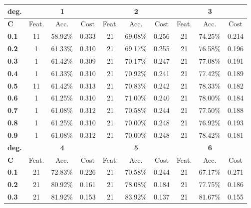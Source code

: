 \begin{table}[h]
    \centering
    \begin{tabular}{l | c c c|c c c|c c c}
        \toprule
        \multicolumn{1}{c}{\textbf{deg.}} & \multicolumn{3}{c}{\textbf{1}} & \multicolumn{3}{c}{\textbf{2}} & \multicolumn{3}{c}{\textbf{3}}\\
        \midrule
        \textbf{C}&Feat.&Acc.&Cost&Feat.&Acc.&Cost&Feat.&Acc.&Cost \\
        \midrule
        \textbf{0.1}&      11 & 58.92\% & 0.333 &      21 & 69.08\% & 0.256 &    21 & 74.25\% & 0.214\\
        \textbf{0.2}&      1  & 61.33\% & 0.310 &      21 & 69.17\% & 0.255 &    21 & 76.58\% & 0.196\\
        \textbf{0.3}&      1  & 61.42\% & 0.309 &      21 & 70.17\% & 0.247 &    21 & 77.08\% & 0.191\\
        \textbf{0.4}&      1  & 61.33\% & 0.310 &      21 & 70.92\% & 0.241 &    21 & 77.42\% & 0.189\\
        \textbf{0.5}&      11 & 61.42\% & 0.313 &      21 & 70.83\% & 0.242 &    21 & 78.33\% & 0.182\\
        \textbf{0.6}&      1  & 61.25\% & 0.310 &      21 & 71.00\% & 0.240 &    21 & 78.00\% & 0.184\\
        \textbf{0.7}&      1  & 61.08\% & 0.312 &      21 & 70.58\% & 0.244 &    21 & 77.50\% & 0.188\\
        \textbf{0.8}&      1  & 61.25\% & 0.310 &      21 & 70.00\% & 0.248 &    21 & 76.92\% & 0.193\\
        \textbf{0.9}&      1  & 61.08\% & 0.312 &      21 & 70.00\% & 0.248 &    21 & 78.42\% & 0.181\\
        \bottomrule
        \toprule
        \multicolumn{1}{c}{\textbf{deg.}} & \multicolumn{3}{c}{\textbf{4}} & \multicolumn{3}{c}{\textbf{5}} & \multicolumn{3}{c}{\textbf{6}}\\
        \midrule
        \textbf{C}&Feat.&Acc.&Cost&Feat.&Acc.&Cost&Feat.&Acc.&Cost \\
        \midrule
        \textbf{0.1}&      21 & 72.83\% & 0.226 &      21 & 70.58\% & 0.244 &    21 & 67.17\% & 0.271\\
        \textbf{0.2}&      21 & 80.92\% & 0.161 &      21 & 78.08\% & 0.184 &    21 & 77.75\% & 0.186\\
        \textbf{0.3}&      21 & 81.92\% & 0.153 &      21 & 83.92\% & 0.137 &    21 & 81.67\% & 0.155\\

\end{tabular}
\end{table}
